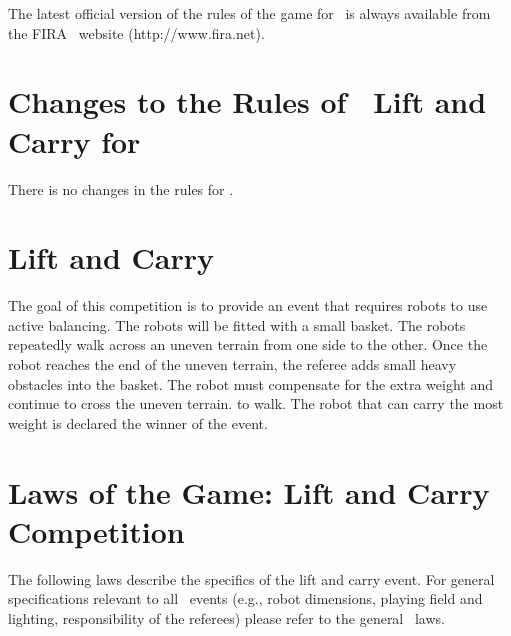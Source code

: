 \documentclass[12pt]{hurocup}
\begin{document}
The latest official version of the rules of the game for \HuroCup\ is
always available from the FIRA \HuroCup\ website (http://www.fira.net).

\section*{Changes to the Rules of \HuroCup\ Lift and Carry for \thisyear}

There is no changes in the rules for \thisyear.

\newpage

\section{Lift and Carry}
\label{sec:lift-and-carry} 

The goal of this competition is to provide an event that requires
robots to use active balancing. The robots will be fitted with a small
basket. The robots repeatedly walk across an uneven terrain from one
side to the other. Once the robot reaches the end of the uneven
terrain, the referee adds small heavy obstacles into the basket. The
robot must compensate for the extra weight and continue to cross the
uneven terrain.  to walk. The robot that can carry the most weight is
declared the winner of the event.

\section{Laws of the Game: Lift and Carry Competition}
\label{sec:rules-lift-carry}

The following laws describe the specifics of the lift and carry
event. For general specifications relevant to all \HuroCup\ events
(e.g., robot dimensions, playing field and lighting, responsibility of
the referees) please refer to the general \HuroCup\ laws.

\label{lc-field}
\end{document}
